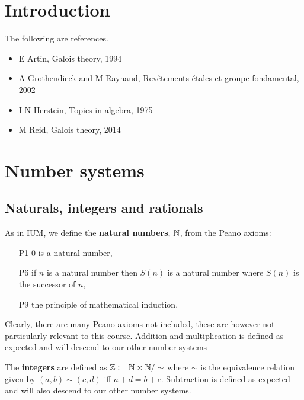 \documentclass{article}
\begin{document}


\section{Introduction}


The following are references.
\begin{itemize}
\item E Artin, Galois theory, 1994
\item A Grothendieck and M Raynaud, Rev\^etements \'etales et groupe fondamental, 2002
\item I N Herstein, Topics in algebra, 1975
\item M Reid, Galois theory, 2014
\end{itemize}

\begin{notation*}
\end{notation*}

\section{Number systems}

\subsection{Naturals, integers and rationals}

\begin{definition}
    As in IUM, we define the \textbf{natural numbers}, $\mathbb{N}$, from the Peano axioms: \begin{enumerate}
        \item[P1] $0$ is a natural number,
        \item[P6] if $n$ is a natural number then $S(n)$ is a natural number where $S(n)$ is the successor of $n$,
        \item[P9] the principle of mathematical induction.
    \end{enumerate}
    Clearly, there are many Peano axioms not included, these are however not particularly relevant to this course. Addition and multiplication is defined as expected and will descend to our other number systems
\end{definition}

\begin{definition}[Integers]
    The \textbf{integers} are defined as $\mathbb{Z} := \mathbb{N}\times\mathbb{N}/\sim$ where $\sim$ is the equivalence relation given by $(a,b)\sim(c,d)$ iff $a+d = b+c$. Subtraction is defined as expected and will also descend to our other number systems.
\end{definition}
\end{document}
